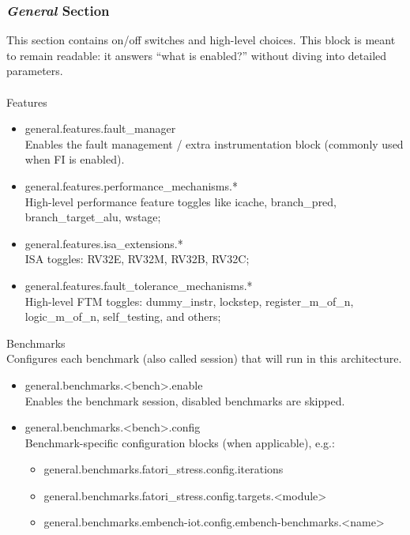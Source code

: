 \subsubsection{\textit{General} Section}
\label{chap3:yaml_general}
 This section contains on/off switches and high-level choices. This block is meant to remain readable: it answers “what is enabled?” without diving into detailed parameters.\\\\
Features
\begin{itemize}
    \item general.features.fault\_manager \\
    Enables the fault management / extra instrumentation block (commonly used when FI is enabled).
    \item general.features.performance\_mechanisms.* \\
    High-level performance feature toggles like icache, branch\_pred, branch\_target\_alu, wstage;
    \item general.features.isa\_extensions.* \\
    ISA toggles: RV32E, RV32M, RV32B, RV32C;
    \item general.features.fault\_tolerance\_mechanisms.* \\
    High-level FTM toggles: dummy\_instr, lockstep, register\_m\_of\_n, logic\_m\_of\_n, self\_testing, and others;
\end{itemize}

 Benchmarks\\
Configures each benchmark (also called session) that will run in this architecture.
\begin{itemize}
    \item general.benchmarks.\textless bench\textgreater.enable \\
    Enables the benchmark session, disabled benchmarks are skipped.
    \item general.benchmarks.\textless bench\textgreater.config \\
    Benchmark-specific configuration blocks (when applicable), e.g.:
    \begin{itemize}
        \item general.benchmarks.fatori\_stress.config.iterations
        \item general.benchmarks.fatori\_stress.config.targets.\textless module\textgreater
        \item general.benchmarks.embench-iot.config.embench-benchmarks.\textless name\textgreater
    \end{itemize}
\end{itemize}

